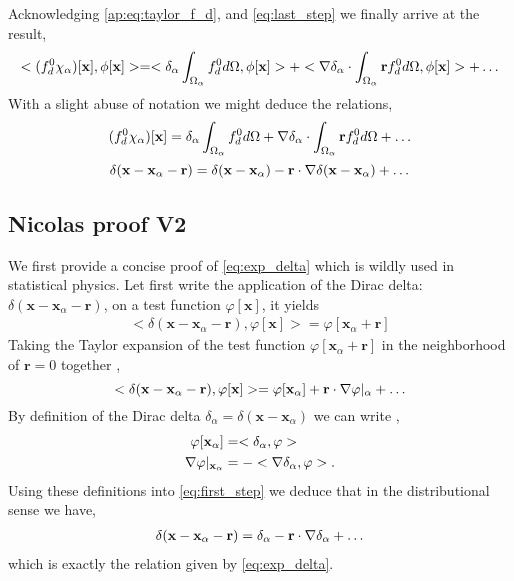 Acknowledging \ref{ap:eq:taylor_f_d}, and \ref{eq:last_step} we finally arrive at the result, 
\begin{align}
    <   (f^0_d \chi_\alpha)[\textbf{x}]
    , \phi[\textbf{x}]> 
    = 
    <\delta_\alpha
    \intO{
        f^0_d
    }
    , \phi[\textbf{x}]>
    + < \grad\delta_\alpha
    \cdot 
    \intO{
    \textbf{r}
    f^0_d
     }
     , \phi[\textbf{x}]>
    + \ldots
    \label{eq:last2_step}
\end{align}
With a slight abuse of notation we might deduce the relations, 
\begin{equation}
    (f^0_d \chi_\alpha)[\textbf{x}]
    = 
    \delta_\alpha
    \int_{\Omega_{\alpha}} 
        f^0_d
     d\Omega
    + \mathbf{\nabla}\delta_\alpha
    \cdot 
    \int_{\Omega_{\alpha}} 
    \textbf{r}
    f^0_d
      d\Omega
    + \ldots
\end{equation}
\begin{equation}
    \delta(\textbf{x}- \textbf{x}_\alpha - \textbf{r})
    = 
    \delta(\textbf{x}- \textbf{x}_\alpha)
    - \textbf{r}\cdot \mathbf{\nabla}\delta(\textbf{x}- \textbf{x}_\alpha)
    + \ldots
\end{equation}

\subsection{Nicolas proof V2}

We first provide a concise proof of \ref{eq:exp_delta} which is wildly used in statistical physics. 
Let first write the application of the Dirac delta: $\delta(\textbf{x} - \textbf{x}_\alpha - \textbf{r})$, on a test function $\varphi[\textbf{x}]$, it yields
\begin{align*}
    < \delta(\textbf{x} - \textbf{x}_\alpha - \textbf{r}), \varphi[\textbf{x}]> 
    =
    \varphi[\textbf{x}_\alpha + \textbf{r}]  
\end{align*}
Taking the Taylor expansion of the test function $\varphi[\textbf{x}_\alpha + \textbf{r}]$ in the neighborhood of $\textbf{r} = 0$ together , 
\begin{equation}
    < \delta(\textbf{x} - \textbf{x}_\alpha - \textbf{r}), \varphi[\textbf{x}]> 
    =
    \varphi[\textbf{x}_\alpha] 
    + \textbf{r} \cdot \grad \varphi|_\alpha
    + \ldots
    \label{eq:first_step}
\end{equation}
By definition of the Dirac delta $\delta_\alpha = \delta(\textbf{x}-\textbf{x}_\alpha)$ we can write \citep{appel2007}, 
\begin{align}
    \varphi[\textbf{x}_\alpha] &=  <\delta_\alpha, \varphi> \\
    \mathbf{\nabla}\varphi|_{\textbf{x}_\alpha} &=  - <\mathbf{\nabla}\delta_\alpha, \varphi>.  
\end{align}
Using these definitions into \ref{eq:first_step} we deduce that in the distributional sense we have, 
\begin{align}
    \delta(\textbf{x} - \textbf{x}_\alpha - \textbf{r})
    =
    \delta_\alpha - \textbf{r}\cdot \grad \delta_\alpha + \ldots
    \label{eq:exp_delta2}
\end{align}
which is exactly the relation given by \ref{eq:exp_delta}. 

